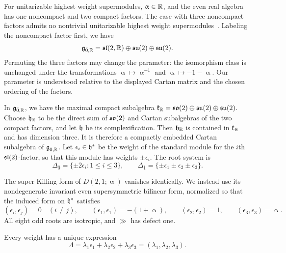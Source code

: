 For unitarizable highest weight supermodules, $\upalpha\in\RR$, and the even real algebra has one noncompact and two compact factors. The case with three noncompact factors admits no nontrivial unitarizable highest weight supermodules~\cite[Lemma~12.1 and Propositions~12.2--12.3]{jakobsen1994full}. Labeling the noncompact factor first, we have
\begin{equation}\label{eq::real_form_D(2,1)}
\gg_{\bar0,\RR}=\sl(2,\RR)\oplus\su(2)\oplus\su(2).
\end{equation}
Permuting the three factors may change the parameter: the isomorphism class is unchanged under the transformations $\upalpha\mapsto\upalpha^{-1}$ and $\upalpha\mapsto-1-\upalpha$. Our parameter is understood relative to the displayed Cartan matrix and the chosen ordering of the factors.

In $\gg_{\bar{0},\RR}$, we have the maximal compact subalgebra $\kk_{\RR}=\so(2)\oplus\su(2)\oplus\su(2)$. Choose $\hh_{\RR}$ to be the direct sum of $\so(2)$ and Cartan subalgebras of the two compact factors, and let $\hh$ be its complexification. Then $\hh_{\RR}$ is contained in $\kk_{\RR}$ and has dimension three. It is therefore a compactly embedded Cartan subalgebra of $\gg_{\bar0,\RR}$.
Let $\epsilon_i\in\hh^*$ be the weight of the standard module for the $i$th $\sl(2)$-factor, so that this module has weights $\pm\epsilon_i$. The root system is
\begin{equation}
\Delta_{\bar0}
=
\{\pm2\epsilon_i:1\leq i\leq3\},
\qquad
\Delta_{\bar1}
=
\{\pm\epsilon_1\pm\epsilon_2\pm\epsilon_3\}.
\label{eq::D21alpha_roots}
\end{equation}

The super Killing form of $D(2,1;\upalpha)$ vanishes identically. We instead use its nondegenerate invariant even supersymmetric bilinear form, normalized so that the induced form on $\hh^*$ satisfies
\begin{equation}
(\epsilon_i,\epsilon_j)=0\quad(i\neq j),
\qquad
(\epsilon_1,\epsilon_1)=-(1+\upalpha),
\qquad
(\epsilon_2,\epsilon_2)=1,
\qquad
(\epsilon_3,\epsilon_3)=\upalpha.
\label{eq::D21alpha_form}
\end{equation}
All eight odd roots are isotropic, and $\gg$ has defect one. 

Every weight has a unique expression
\begin{equation}
\Lambda
=
\lambda_1\epsilon_1+\lambda_2\epsilon_2+\lambda_3\epsilon_3
=
(\lambda_1,\lambda_2,\lambda_3).
\end{equation}

